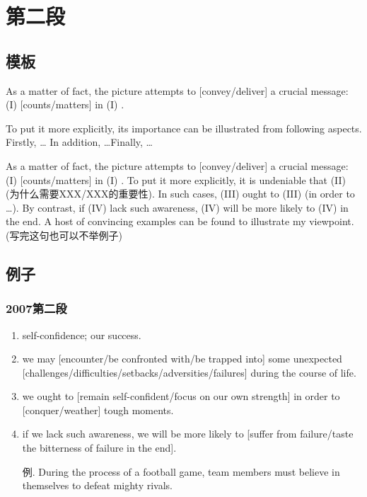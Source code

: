 \chapter{第二段}

\section{模板}


As a matter of fact, the picture
attempts to [convey/deliver] a crucial message:
\textrm{(I)} [counts/matters] in \textrm{(I)} .

\noindent To put it more explicitly, its importance can be illustrated
from following aspects. Firstly, \dots
In addition, \dots Finally, \dots


As a matter of fact, the picture
attempts to [convey/deliver] a crucial message:
\textrm{(I)} [counts/matters] in \textrm{(I)} .
To put it more explicitly, it is undeniable that 
\textrm{(II)} (为什么需要XXX/XXX的重要性).
In such cases, \textrm{(III)} ought to \textrm{(III)}
(in order to \dots).
By contrast, if \textrm{(IV)} lack such awareness, \textrm{(IV)}
will be more likely to \textrm{(IV)} in the end.
A host of convincing examples can be found to illustrate my viewpoint.
(写完这句也可以不举例子)

\section{例子}

\subsection{2007第二段}

\begin{enumerate}
    \item self-confidence; our success.
    \item we may [encounter/be confronted with/be trapped into]
    some unexpected [challenges/difficulties/setbacks/adversities/failures]
    during the course of life.
    \item we ought to [remain self-confident/focus on our own strength]
    in order to [conquer/weather] tough moments.
    \item if we lack such awareness, we will be more likely 
    to [suffer from failure/taste the bitterness of failure in the end].
    \item[例.] During the process of a football game, team members must believe in 
    themselves to defeat mighty rivals.
\end{enumerate}

